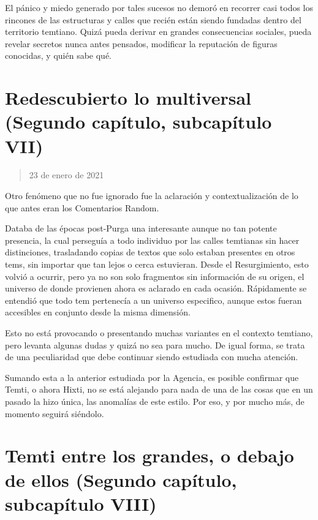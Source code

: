 \documentclass[
  spanish,
]{book}
\begin{document}
El pánico y miedo generado por tales sucesos no demoró en recorrer casi todos los rincones de las estructuras y calles que recién están siendo fundadas dentro del territorio temtiano. Quizá pueda derivar en grandes consecuencias sociales, pueda revelar secretos nunca antes pensados, modificar la reputación de figuras conocidas, y quién sabe qué.

\hypertarget{redescubierto-lo-multiversal-segundo-capuxedtulo-subcapuxedtulo-vii}{%
\section{Redescubierto lo multiversal (Segundo capítulo, subcapítulo VII)}\label{redescubierto-lo-multiversal-segundo-capuxedtulo-subcapuxedtulo-vii}}

\begin{quote}
23 de enero de 2021
\end{quote}

Otro fenómeno que no fue ignorado fue la aclaración y contextualización de lo que antes eran los Comentarios Random.

Databa de las épocas post-Purga una interesante aunque no tan potente presencia, la cual perseguía a todo individuo por las calles temtianas sin hacer distinciones, trasladando copias de textos que solo estaban presentes en otros tems, sin importar que tan lejos o cerca estuvieran. Desde el Resurgimiento, esto volvió a ocurrir, pero ya no son solo fragmentos sin información de su origen, el universo de donde provienen ahora es aclarado en cada ocasión. Rápidamente se entendió que todo tem pertenecía a un universo especifico, aunque estos fueran accesibles en conjunto desde la misma dimensión.

Esto no está provocando o presentando muchas variantes en el contexto temtiano, pero levanta algunas dudas y quizá no sea para mucho. De igual forma, se trata de una peculiaridad que debe continuar siendo estudiada con mucha atención.

Sumando esta a la anterior estudiada por la Agencia, es posible confirmar que Temti, o ahora Hixti, no se está alejando para nada de una de las cosas que en un pasado la hizo única, las anomalías de este estilo. Por eso, y por mucho más, de momento seguirá siéndolo.

\hypertarget{temti-entre-los-grandes-o-debajo-de-ellos-segundo-capuxedtulo-subcapuxedtulo-viii}{%
\section{Temti entre los grandes, o debajo de ellos (Segundo capítulo, subcapítulo VIII)}\label{temti-entre-los-grandes-o-debajo-de-ellos-segundo-capuxedtulo-subcapuxedtulo-viii}}
\end{document}
